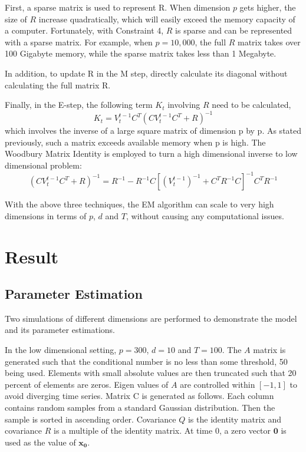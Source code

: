 \documentclass[fleqn]{article}
\newcommand{\T}{T}
\begin{document}
First, a sparse matrix is used to represent R. When dimension $p$ gets higher, the size of $R$ increase quadratically, which will easily exceed the memory capacity of a computer.  Fortunately, with Constraint 4, $R$ is sparse and can be represented with a sparse matrix. For example, when $p=10,000$, the full $R$ matrix takes over 100 Gigabyte memory, while the sparse matrix takes less than 1 Megabyte.

In addition, to update R in the M step, directly calculate its diagonal without calculating the full matrix R.

Finally, in the E-step, the following term $K_t$ involving $R$ need to be calculated,
\[
K_t=V_t^{t-1}C^{\T}(CV_t^{t-1}C^{\T}+R)^{-1}
\]
which involves the inverse of a large square matrix of dimension p by p. As stated previously, such a matrix exceeds available memory when p is high. The Woodbury Matrix Identity is employed to turn a high dimensional inverse to low dimensional problem:
\[
(CV_t^{t-1}C^{\T}+R)^{-1} = R^{-1} - R^{-1}C[(V_t^{t-1})^{-1} + C^{\T}R^{-1}C]^{-1}C^{\T}R^{-1}
\]

With the above three techniques, the EM algorithm can scale to very high dimensions in terms of $p$, $d$ and $T$, without causing any computational issues.



\section{Result}
\subsection{Parameter Estimation}
\label{sec:lowdsim}
Two simulations of different dimensions are performed to demonstrate the model and its parameter estimations.

In the low dimensional setting, $p = 300$, $d = 10$ and $T = 100$. The $A$ matrix is generated such that the conditional number is no less than some threshold, 50 being used. Elements with small absolute values are then truncated such that 20 percent of elements are zeros. Eigen values of $A$ are controlled within $[-1,1]$ to avoid diverging time series. Matrix C is generated as follows. Each column contains random samples from a standard Gaussian distribution. Then the sample is sorted in ascending order. Covariance $Q$ is the identity matrix and covariance $R$ is a multiple of the identity matrix. At time 0, a zero vector $\mathbf{0}$ is used as the value of $\mathbf{x_0}$.
\end{document}
